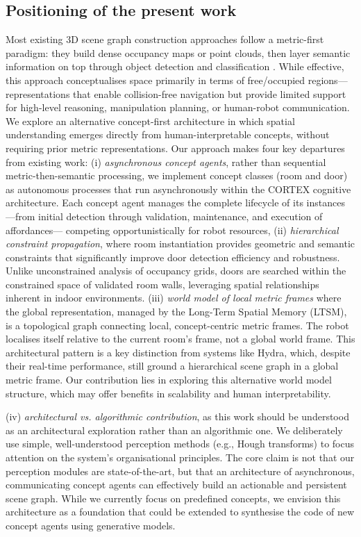 \documentclass[10pt,a4paper]{article}
\begin{document}
%
\subsection{Positioning of the present work}
Most existing 3D scene graph construction approaches follow a metric-first paradigm: they build dense occupancy maps or point clouds, then layer semantic information on top through object detection and classification \cite{wu2021scenegraphfusionincremental3dscene}\cite{hughes2022hydra}\cite{rosinol2021kimeraslamspatialperception}. While effective, this approach conceptualises space primarily in terms of free/occupied regions—representations that enable collision-free navigation but provide limited support for high-level reasoning, manipulation planning, or human-robot communication.
We explore an alternative concept-first architecture in which spatial understanding emerges directly from human-interpretable concepts, without requiring prior metric representations. 
Our approach makes four key departures from existing work:
(i) \textit{asynchronous concept agents}, rather than sequential metric-then-semantic processing, we implement concept classes (room and door) as autonomous processes that run asynchronously within the CORTEX cognitive architecture. Each concept agent manages the complete lifecycle of its instances —from initial detection through validation, maintenance, and execution of affordances— competing opportunistically for robot resources,
(ii) \textit{hierarchical constraint propagation}, where room instantiation provides geometric and semantic constraints that significantly improve door detection efficiency and robustness. Unlike unconstrained analysis of occupancy grids, doors are searched within the constrained space of validated room walls, leveraging spatial relationships inherent in indoor environments. 
%
%
(iii) \textit{world model of local metric frames} where the global representation, managed by the Long-Term Spatial Memory (LTSM), is a topological graph connecting local, concept-centric metric frames. The robot localises itself relative to the current room's frame, not a global world frame. This architectural pattern is a key distinction from systems like Hydra, which, despite their real-time performance, still ground a hierarchical scene graph in a global metric frame. Our contribution lies in exploring this alternative world model structure, which may offer benefits in scalability and human interpretability. 

(iv) \textit{architectural vs. algorithmic contribution}, as this work should be understood as an architectural exploration rather than an algorithmic one. We deliberately use simple, well-understood perception methods (e.g., Hough transforms) to focus attention on the system's organisational principles. The core claim is not that our perception modules are state-of-the-art, but that an architecture of asynchronous, communicating concept agents can effectively build an actionable and persistent scene graph. While we currently focus on predefined concepts, we envision this architecture as a foundation that could be extended to synthesise the code of new concept agents using generative models.  
\end{document}
